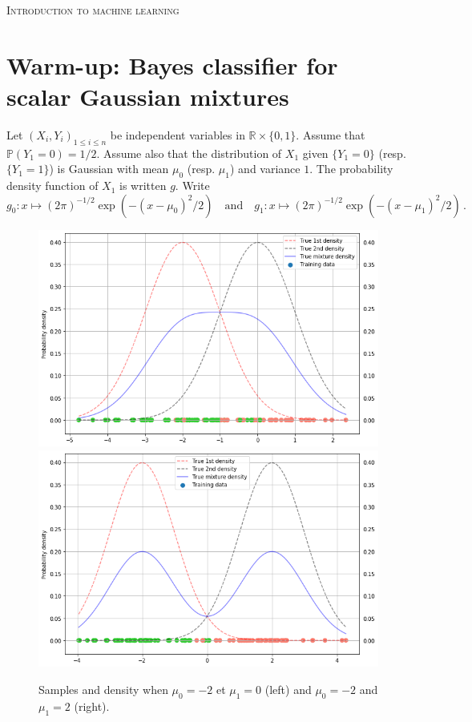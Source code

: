 \documentclass[a4paper,10pt,fleqn]{article}
\newcommand{\eqsp}{\,}
\newcommand{\1}{\ensuremath{\mathbbm{1}}}
\begin{document}

\noindent\hrulefill

\begin{center}
\textsc{Introduction to machine learning}
\end{center}
\hrulefill

\medskip


\section{Warm-up: Bayes classifier for scalar Gaussian mixtures}
Let $(X_i,Y_i)_{1\leqslant i\leqslant n}$ be independent variables in $\mathbb{R}\times \{0,1\}$. Assume that  $\mathbb{P}(Y_1 = 0) = 1/2$. Assume also that the distribution of $X_1$ given $\{Y_1= 0\}$ (resp. $\{Y_1= 1\}$) is Gaussian with mean $\mu_0$ (resp. $\mu_1$) and variance $1$. The probability density function of $X_1$ is written $g$. Write
$$
g_0: x \mapsto (2\pi)^{-1/2}\exp(-(x-\mu_0)^2/2)\quad\mathrm{and} \quad g_1: x \mapsto (2\pi)^{-1/2}\exp(-(x-\mu_1)^2/2)\eqsp.
$$
\begin{figure}[h!]
\begin{center}
\includegraphics[scale=0.3]{mu0_mum2.png}
\includegraphics[scale=0.3]{mu2_mum2.png}
\caption{Samples and density when   $\mu_0 = -2$ et $\mu_1 = 0$ (left) and $\mu_0 = -2$ and $\mu_1 = 2$ (right).}
\end{center}
\end{figure}
\end{document}
